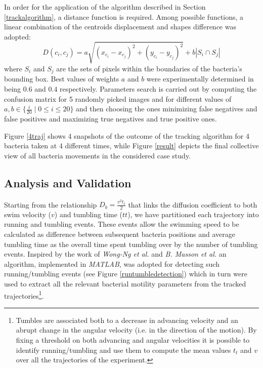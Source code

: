 In order for the application of the algorithm described in Section \ref{trackalgorithm}, a distance function is required.
Among possible functions, a linear combination of the centroids displacement and shapes difference was adopted:
\begin{equation}
\label{sec:bacttracking}
D(c_i,c_j) = a \sqrt{(x_{c_i} - x_{c_j})^2 + (y_{c_i}-y_{c_j})^2} + b |S_i \cap S_j|
\end{equation}
where $S_i$ and $S_j$ are the sets of pixels within the boundaries of the bacteria's  bounding box. Best values of weights $a$ and $b$ were experimentally determined in being $0.6$ and $0.4$ respectively. 
Parameters search is carried out by computing the confusion matrix for 5 randomly picked images and for different values of $a,b \in \{\frac{i}{20}\;|\;0\leq i \leq 20\}$ and then choosing the ones minimizing false negatives and false positives and maximizing true negatives and true positive ones. 

Figure \ref{4traj} shows 4 snapshots of the outcome of the tracking algorithm for 4 bacteria taken at 4 different times, while Figure \ref{result} depicts the final collective view of all bacteria movements in the considered case study. 


\subsection{Analysis and Validation}
Starting from the relationship $D_b=  \frac{v^2 t_t}{2}$  \cite{Berg:1993} that links the diffusion coefficient to both swim velocity ($v$) and tumbling time ($tt$), 
we have partitioned each trajectory into running and tumbling events. 
These events allow the swimming speed to be calculated as difference between subsequent bacteria positions and average tumbling time as the overall time spent tumbling over by the number of tumbling events. 
Inspired by the work of \textit{Wong-Ng et al.} \cite{Wong-Ng:2016} and \textit{B. Masson et al.} \cite{Masson31012012} an algorithm, implemented in \textit{MATLAB}, was adopted for detecting such running/tumbling events (see Figure \ref{runtumbledetection})  which in turn were used to extract all the relevant bacterial motility parameters from the tracked trajectories\footnote{Tumbles are associated both to a decrease in advancing velocity and an abrupt change in the angular velocity (i.e. in the direction of the motion). By fixing a threshold on both advancing and angular velocities it is possible to identify running/tumbling and use them to compute the mean values $t_t$ and $v$ over all the trajectories of the experiment.}.

